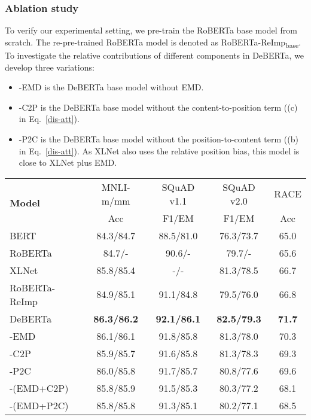 \documentclass{article}
\newcommand\ModelName{DeBERTa}
\newcommand\DecoderName{EMD}
\begin{document}
\subsubsection{Ablation study}
\label{subsec:abs}
To verify our experimental setting, we pre-train the RoBERTa base model from scratch.  
The re-pre-trained RoBERTa model is denoted as RoBERTa-ReImp\textsubscript{base}. 
To investigate the relative contributions of different components in {\ModelName}, we develop three variations:
\begin{itemize}
\item {-\DecoderName} is the {\ModelName} base model without \DecoderName.
    \item {-C2P} is the  {\ModelName} base model without the content-to-position term ((c) in Eq.~\ref{dis-att}).
    \item {-P2C} is the {\ModelName} base model without the position-to-content term ((b) in Eq.~\ref{dis-att}). As XLNet also uses the relative position bias, this model is close to XLNet plus \DecoderName.
\end{itemize}
\begin{table*}[htb!]
    \centering
    \begin{tabular}{@{\hskip1pt}l| c| cc|c@{\hskip1pt}}
        \toprule
        \multirow{2}{*}{\bf Model} &{MNLI-m/mm}& {SQuAD v1.1} &{SQuAD v2.0} &RACE\\ 
         & { Acc}& F1/EM & F1/EM  & Acc\\
        \midrule
        BERT \cite{devlin2018bert} & 84.3/84.7 & 88.5/81.0 &76.3/73.7   & 65.0 \\ RoBERTa \cite{liu2019roberta} & 84.7/- & 90.6/- &79.7/-   & 65.6\\ XLNet \cite{yang2019xlnet}& 85.8/85.4 & -/- & 81.3/78.5  & 66.7\\ \hline
        RoBERTa-ReImp & 84.9/85.1 & 91.1/84.8 &79.5/76.0   & 66.8\\ \hline {\ModelName} & \textbf{86.3/86.2} &\textbf{92.1/86.1} & \textbf{82.5/79.3}  &\textbf{ 71.7}\\
        -EMD & 86.1/86.1& 91.8/85.8 &81.3/78.0   & 70.3\\ -C2P  & 85.9/85.7 & 91.6/85.8 &81.3/78.3   & 69.3\\ -P2C  & 86.0/85.8 & 91.7/85.7 &80.8/77.6   & 69.6\\ -(EMD+C2P) & 85.8/85.9 & 91.5/85.3 &80.3/77.2   & 68.1\\ -(EMD+P2C)  & 85.8/85.8& 91.3/85.1 &80.2/77.1    & 68.5\\ \bottomrule
        \end{tabular}
    \caption{
    Ablation study of the DeBERTa base model.
    }
    \label{tab:ablation}
\end{table*}
\end{document}
